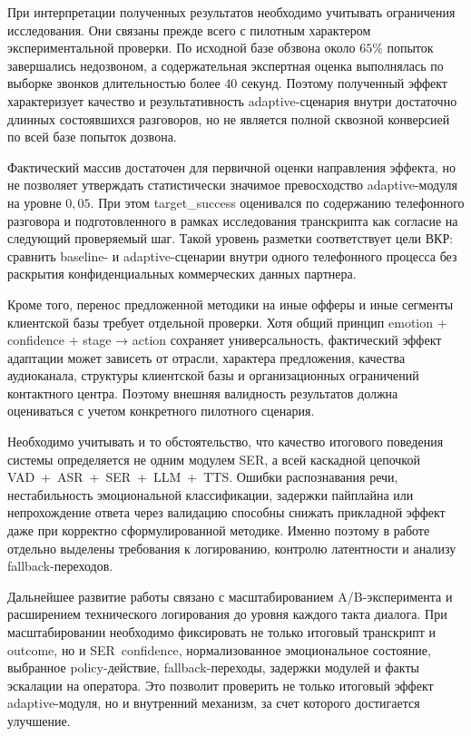 \documentclass[a4paper,14pt]{extarticle}
\renewcommand{\texttt}[1]{\textnormal{#1}}
\begin{document}
При интерпретации полученных результатов необходимо учитывать
ограничения исследования. Они связаны прежде всего с пилотным характером
экспериментальной проверки. По исходной базе обзвона около \(65\%\)
попыток завершались недозвоном, а содержательная экспертная оценка
выполнялась по выборке звонков длительностью более \(40\) секунд.
Поэтому полученный эффект характеризует качество и результативность
adaptive-сценария внутри достаточно длинных состоявшихся разговоров, но
не является полной сквозной конверсией по всей базе попыток дозвона.

Фактический массив достаточен для первичной оценки направления эффекта,
но не позволяет утверждать статистически значимое превосходство
adaptive-модуля на уровне \(0{,}05\). При этом \texttt{target\_\allowbreak{}success}
оценивался по содержанию телефонного разговора и подготовленного в
рамках исследования транскрипта как согласие на следующий проверяемый
шаг. Такой уровень разметки соответствует цели ВКР: сравнить baseline- и
adaptive-сценарии внутри одного телефонного процесса без раскрытия
конфиденциальных коммерческих данных партнера.

Кроме того, перенос предложенной методики на иные офферы и иные сегменты
клиентской базы требует отдельной проверки. Хотя общий принцип emotion +
confidence + stage → action сохраняет универсальность, фактический
эффект адаптации может зависеть от отрасли, характера предложения,
качества аудиоканала, структуры клиентской базы и организационных
ограничений контактного центра. Поэтому внешняя валидность результатов
должна оцениваться с учетом конкретного пилотного сценария.

Необходимо учитывать и то обстоятельство, что качество итогового
поведения системы определяется не одним модулем \texttt{SER}, а всей
каскадной цепочкой \texttt{VAD\ +\ ASR\ +\ SER\ +\ LLM\ +\ TTS}. Ошибки
распознавания речи, нестабильность эмоциональной классификации, задержки
пайплайна или непрохождение ответа через валидацию способны снижать
прикладной эффект даже при корректно сформулированной методике. Именно
поэтому в работе отдельно выделены требования к логированию, контролю
латентности и анализу \texttt{fallback}-переходов.

Дальнейшее развитие работы связано с масштабированием A/B-эксперимента и
расширением технического логирования до уровня каждого такта диалога.
При масштабировании необходимо фиксировать не только итоговый транскрипт
и outcome, но и \texttt{SER\ confidence}, нормализованное эмоциональное
состояние, выбранное \texttt{policy}-действие,
\texttt{fallback}-переходы, задержки модулей и факты эскалации на
оператора. Это позволит проверить не только итоговый эффект
adaptive-модуля, но и внутренний механизм, за счет которого достигается
улучшение.
\end{document}

